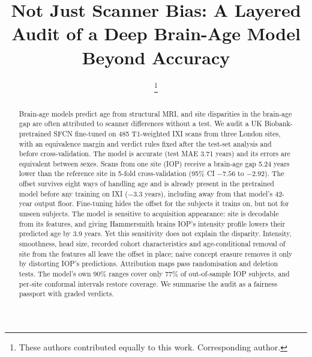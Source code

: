\documentclass[conference]{IEEEtran}
\begin{document}
\title{Not Just Scanner Bias: A Layered Audit of a Deep Brain-Age Model Beyond Accuracy}

\author{
\and
{}
\and
{}
\thanks{These authors contributed equally to this work. Corresponding author.}
}

\maketitle

\begin{abstract}
Brain-age models predict age from structural MRI, and site disparities in the brain-age gap are often attributed to scanner differences without a test. We audit a UK Biobank-pretrained SFCN fine-tuned on 485 T1-weighted IXI scans from three London sites, with an equivalence margin and verdict rules fixed after the test-set analysis and before cross-validation. The model is accurate (test MAE 3.71 years) and its errors are equivalent between sexes. Scans from one site (IOP) receive a brain-age gap 5.24 years lower than the reference site in 5-fold cross-validation (95\% CI $-7.56$ to $-2.92$). The offset survives eight ways of handling age and is already present in the pretrained model before any training on IXI ($-3.3$ years), including away from that model's 42-year output floor. Fine-tuning hides the offset for the subjects it trains on, but not for unseen subjects. The model is sensitive to acquisition appearance: site is decodable from its features, and giving Hammersmith brains IOP's intensity profile lowers their predicted age by 3.9 years. Yet this sensitivity does not explain the disparity. Intensity, smoothness, head size, recorded cohort characteristics and age-conditional removal of site from the features all leave the offset in place; naive concept erasure removes it only by distorting IOP's predictions. Attribution maps pass randomisation and deletion tests. The model's own 90\% ranges cover only 77\% of out-of-sample IOP subjects, and per-site conformal intervals restore coverage. We summarise the audit as a fairness passport with graded verdicts.
\end{abstract}
\end{document}
